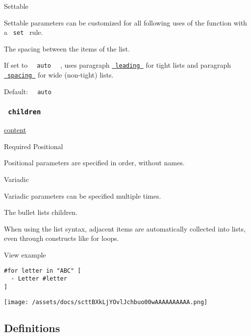 {{ Settable }}

\label{parameters-spacing-settable-tooltip}
Settable parameters can be customized for all following uses of the
function with a \texttt{\ set\ } rule.

The spacing between the items of the list.

If set to \texttt{\ }{\texttt{\ auto\ }}\texttt{\ } , uses paragraph
\href{/docs/reference/model/par/\#parameters-leading}{\texttt{\ leading\ }}
for tight lists and paragraph
\href{/docs/reference/model/par/\#parameters-spacing}{\texttt{\ spacing\ }}
for wide (non-tight) lists.

Default: \texttt{\ }{\texttt{\ auto\ }}\texttt{\ }

\subsubsection{\texorpdfstring{\texttt{\ children\ }}{ children }}\label{parameters-children}

\href{/docs/reference/foundations/content/}{content}

{Required} {{ Positional }}

\label{parameters-children-positional-tooltip}
Positional parameters are specified in order, without names.

{{ Variadic }}

\label{parameters-children-variadic-tooltip}
Variadic parameters can be specified multiple times.

The bullet list\textquotesingle s children.

When using the list syntax, adjacent items are automatically collected
into lists, even through constructs like for loops.


View example

\begin{verbatim}
#for letter in "ABC" [
  - Letter #letter
]
\end{verbatim}

\texttt{[image: /assets/docs/scttBXkLjYOvlJchbuo00wAAAAAAAAAA.png]}

\subsection{\texorpdfstring{{ Definitions
}}{ Definitions }}\label{definitions}

